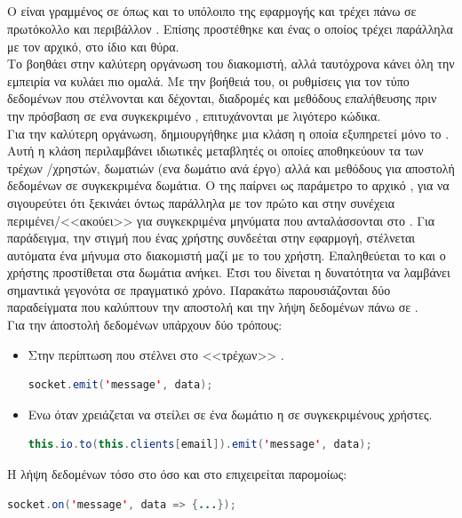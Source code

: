 \subsection{}
\pSpace Ο  είναι γραμμένος σε  όπως και το υπόλοιπο της εφαρμογής και τρέχει πάνω σε πρωτόκολλο  και περιβάλλον . Επίσης προστέθηκε και ένας  ο οποίος τρέχει παράλληλα με τον αρχικό, στο ίδιο  και θύρα.\\
\pSpace Το  βοηθάει στην καλύτερη οργάνωση του διακομιστή, αλλά ταυτόχρονα κάνει όλη την εμπειρία να κυλάει πιο ομαλά. Με την βοήθειά του, οι ρυθμίσεις για τον τύπο δεδομένων που στέλνονται και δέχονται, διαδρομές και μεθόδους επαλήθευσης πριν την πρόσβαση σε ενα συγκεκριμένο , επιτυχάνονται με λιγότερο κώδικα.\\
\pSpace Για την καλύτερη οργάνωση, δημιουργήθηκε μια κλάση  η οποία εξυπηρετεί μόνο το . Αυτή η κλάση περιλαμβάνει ιδιωτικές μεταβλητές οι οποίες αποθηκεύουν τα  των τρέχων /χρηστών, δωματιών (ενα δωμάτιο ανά έργο) αλλά και μεθόδους για αποστολή δεδομένων σε συγκεκριμένα δωμάτια. Ο  της παίρνει ως παράμετρο το αρχικό , για να σιγουρεύτει ότι ξεκινάει όντως παράλληλα με τον πρώτο και στην συνέχεια περιμένει/<<ακούει>> για συγκεκριμένα μηνύματα που ανταλάσσονται στο . Για παράδειγμα, την στιγμή που ένας χρήστης συνδεέται στην εφαρμογή, στέλνεται αυτόματα ένα μήνυμα στο  διακομιστή μαζί με το  του χρήστη. Επαληθεύεται το  και ο χρήστης προστίθεται στα δωμάτια ανήκει. Έτσι του δίνεται η δυνατότητα να λαμβάνει σημαντικά γεγονότα σε πραγματικό χρόνο. Παρακάτω παρουσιάζονται δύο παραδείγματα που καλύπτουν την αποστολή και την λήψη δεδομένων πάνω σε .\\
\pSpace Για την άποστολή δεδομένων υπάρχουν δύο τρόπους:
\begin{itemize}
	\item Στην περίπτωση που στέλνει στο <<τρέχων>> .
	\begin{lstlisting}[language=Java]
socket.emit('message', data); 
	\end{lstlisting}
	\item Ενω όταν χρειάζεται να στείλει σε ένα δωμάτιο η σε συγκεκριμένους χρήστες.
	\begin{lstlisting}[language=Java]
this.io.to(this.clients[email]).emit('message', data);
	\end{lstlisting}
\end{itemize}
\pSpace Η λήψη δεδομένων τόσο στο  όσο και στο  επιχειρείται παρομοίως:
	\begin{lstlisting}[language=Java]
	socket.on('message', data => {...});
	\end{lstlisting}

